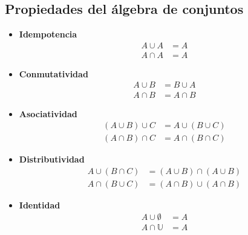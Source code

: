 \subsection{Propiedades del álgebra de conjuntos}

\begin{itemize}

\item \textbf{Idempotencia}
\begin{equation}
    \begin{array}{ll}
        A \cup A & = A \\
        A \cap A & = A
    \end{array}
\end{equation}

\item \textbf{Conmutatividad}
\begin{equation}
    \begin{array}{ll}
        A \cup B & = B \cup A \\
        A \cap B & = A \cap B
    \end{array}
\end{equation}

\item \textbf{Asociatividad}
\begin{equation}
    \begin{array}{ll}
        (A \cup B) \cup C & = A \cup (B \cup C) \\
        (A \cap B) \cap C & = A \cap (B \cap C)
    \end{array}
\end{equation}

\item \textbf{Distributividad}
\begin{equation}
    \begin{array}{ll}
        A \cup (B \cap C) & = (A \cup B) \cap (A \cup B) \\
        A \cap (B \cup C) & = (A \cap B) \cup (A \cap B)
    \end{array}
\end{equation}

\item \textbf{Identidad}
\begin{equation}
    \begin{array}{ll}
        A \cup \emptyset & = A \\
        A \cap \mathbb{U} & = A
    \end{array}
\end{equation}


\end{itemize}
